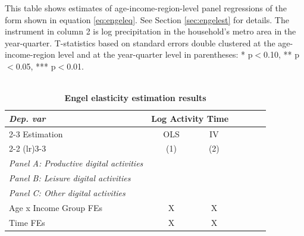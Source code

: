 \documentclass[12pt]{article}
\begin{document}
\begin{table}[htbp] \renewcommand{\arraystretch}{0.95}
\caption{\\ \centering  \textbf{Engel elasticity estimation results}}  

\vspace{-0.1cm} \footnotesize    This table shows estimates of age-income-region-level panel regressions of the form shown in equation \ref{eq:engeleq}. See Section \ref{sec:engelest} for details. The instrument in column 2 is log precipitation in the household's metro area in the year-quarter. T-statistics based on standard errors double clustered at the age-income-region level and at the year-quarter level in parentheses: * p$<$0.10, ** p$<$0.05, *** p$<$0.01. 
\footnotesize

\begin{center}

\begin{tabular}{@{}l*{6}{c}@{}}
\toprule
\textit{Dep. var} &   \multicolumn{2}{c}{Log Activity Time} \\
   \cmidrule(lr){2-3}
   	Estimation & OLS & IV  \\ 

      \cmidrule(lr){2-2}  \cmidrule(lr){3-3} 
                                        &\multicolumn{1}{c}{(1)}   &\multicolumn{1}{c}{(2)}       \\ 
                   \midrule
\emph{Panel A: Productive digital activities}  && \\
                   
                     
\midrule
\emph{Panel B: Leisure digital activities}  && \\
                   
                     
\midrule
\emph{Panel C: Other digital activities}  && \\
                   
                     
\midrule
	Age x Income Group FEs & X & X	     \\		
	Time FEs & X & X	   \\		
    \bottomrule
\end{tabular}
\label{tab:engel_regs_main} 
\end{center}
\end{table}
\end{document}
